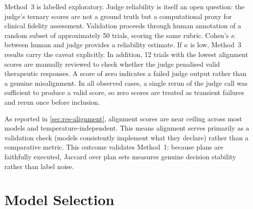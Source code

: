 Method~3 is labelled exploratory. Judge reliability is itself an open
question: the judge's ternary scores are not a ground truth but a
computational proxy for clinical fidelity assessment. Validation proceeds
through human annotation of a random subset of approximately 50 trials,
scoring the same rubric. Cohen's $\kappa$ between human and judge provides
a reliability estimate. If $\kappa$ is low, Method~3 results carry the
caveat explicitly. In addition, 12 trials with the lowest alignment
scores are manually reviewed to check whether the judge penalised
valid therapeutic responses. A score of zero indicates a failed judge
output rather than a genuine misalignment. In all observed cases, a
single rerun of the judge call was sufficient to produce a valid score,
so zero scores are treated as transient failures and rerun once before
inclusion.

As reported in \autoref{sec:res-alignment}, alignment scores are near
ceiling across most models and temperature-independent. This means
alignment serves primarily as a validation check (models consistently
implement what they declare) rather than a comparative metric. This
outcome validates Method~1: because plans are faithfully executed,
Jaccard over plan sets measures genuine decision stability rather than
label noise.



\section{Model Selection}
\label{sec:meth-models}
%
%

